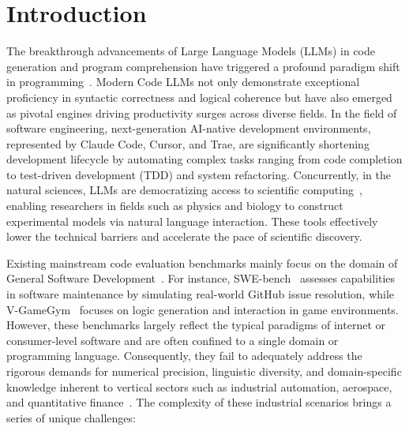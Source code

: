 \documentclass{article}
\theoremstyle{plain}
\theoremstyle{definition}
\theoremstyle{remark}
\begin{document}
\section{Introduction}
The breakthrough advancements of Large Language Models (LLMs) in code generation and program comprehension have triggered a profound paradigm shift in programming~\cite{peng2023impact, openai2023gpt4, feng2020codebert, wang2021codet5, li2022competition}. Modern Code LLMs not only demonstrate exceptional proficiency in syntactic correctness and logical coherence but have also emerged as pivotal engines driving productivity surges across diverse fields. In the field of software engineering, next-generation AI-native development environments, represented by Claude Code, Cursor, and Trae, are significantly shortening development lifecycle by automating complex tasks ranging from code completion to test-driven development (TDD) and system refactoring. Concurrently, in the natural sciences, LLMs are democratizing access to scientific computing~\cite{boiko2023autonomous,zheng2025large}, enabling researchers in fields such as physics and biology to construct experimental models via natural language interaction. These tools effectively lower the technical barriers and accelerate the pace of scientific discovery.

Existing mainstream code evaluation benchmarks mainly focus on the domain of General Software Development~\cite{chen2021evaluating,austin2021program,jain2024livecodebench,yu2024humaneval}. For instance, SWE-bench~\cite{jimenez2024swebench} assesses capabilities in software maintenance by simulating real-world GitHub issue resolution, while V-GameGym~\cite{zhang2025vgamegym} focuses on logic generation and interaction in game environments. However, these benchmarks largely reflect the typical paradigms of internet or consumer-level software and are often confined to a single domain or programming language. Consequently, they fail to adequately address the rigorous demands for numerical precision, linguistic diversity, and domain-specific knowledge inherent to vertical sectors such as industrial automation, aerospace, and quantitative finance~\cite{zhang2025xfinbench}. The complexity of these industrial scenarios brings a series of unique challenges:
\end{document}
